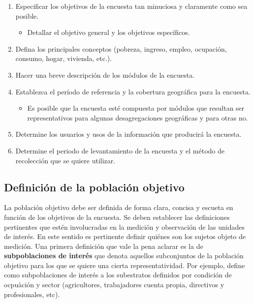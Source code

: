 \begin{enumerate}
\def\labelenumi{\arabic{enumi}.}
\tightlist
\item
  Especificar los objetivos de la encuesta tan minuciosa y claramente como sea posible.

  \begin{itemize}
  \tightlist
  \item
    Detallar el objetivo general y los objetivos específicos.
  \end{itemize}
\item
  Defina los principales conceptos (pobreza, ingreso, empleo, ocupación, consumo, hogar, vivienda, etc.).
\item
  Hacer una breve descripción de los módulos de la encuesta.
\item
  Establezca el período de referencia y la cobertura geográfica para la encuesta.

  \begin{itemize}
  \tightlist
  \item
    Es posible que la encuesta esté compuesta por módulos que resultan ser representativos para algunas desagregaciones geográficas y para otras no.
  \end{itemize}
\item
  Determine los usuarios y usos de la información que producirá la encuesta.
\item
  Determine el periodo de levantamiento de la encuesta y el método de recolección que se quiere utilizar.
\end{enumerate}

\hypertarget{definicion-de-la-poblacion-objetivo}{%
\subsection*{Definición de la población objetivo}\label{definicion-de-la-poblacion-objetivo}}


La población objetivo debe ser definida de forma clara, concisa y escueta en función de los objetivos de la encuesta. Se deben establecer las definiciones pertinentes que estén involucradas en la medición y observación de las unidades de interés. En este sentido es pertinente definir quiénes son los sujetos objeto de medición. Una primera definición que vale la pena aclarar es la de \textbf{subpoblaciones de interés} que denota aquellos subconjuntos de la población objetivo para los que se quiere una cierta representatividad. Por ejemplo, \citet{INE_ES_2002} define como subpoblaciones de interés a los subestratos definidos por condición de ocpuàción y sector (agricultores, trabajadores cuenta propia, directivos y profesionales, etc).

